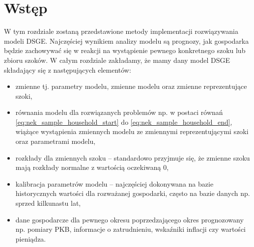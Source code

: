 \section{Wstęp}

W tym rozdziale zostaną przedstawione metody implementacji rozwiązywania modeli DSGE. Najczęściej wynikiem analizy modelu są prognozy, jak gospodarka będzie zachowywać się w reakcji na wystąpienie pewnego konkretnego szoku lub zbioru szoków. W całym rozdziale zakładamy, że mamy dany model DSGE składający się z następujących elementów:
\begin{itemize}
    \item zmienne tj. parametry modelu, zmienne modelu oraz zmienne reprezentujące szoki,
    \item równania modelu dla rozwiązanych problemów np. w postaci równań \eqref{eq:nek_sample_household_start} do \eqref{eq:nek_sample_household_end}, wiążące wystąpienia zmiennych modelu ze zmiennymi reprezentującymi szoki oraz parametrami modelu,
    \item rozkłady dla zmiennych szoku -- standardowo przyjmuje się, że zmienne szoku mają rozkłady normalne z wartością oczekiwaną $0$,
    \item kalibracja parametrów modelu -- najczęściej dokonywana na bazie historycznych wartości dla rozważanej gospodarki, często na bazie danych np. sprzed kilkunastu lat,
    \item dane gospodarcze dla pewnego okresu poprzedzającego okres prognozowany np. pomiary PKB, informacje o zatrudnieniu, wskaźniki inflacji czy wartości pieniądza.
\end{itemize}


